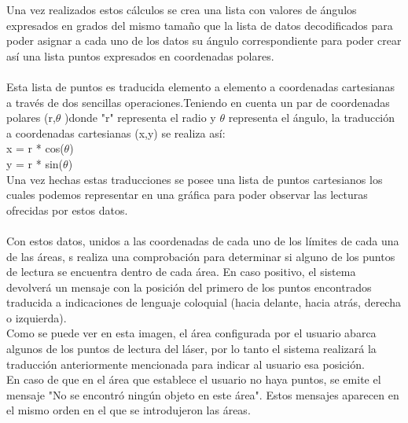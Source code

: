 Una vez realizados estos cálculos se crea una lista con valores de ángulos expresados en grados del mismo tamaño que la lista de datos decodificados para poder asignar a cada uno de los datos su ángulo correspondiente para poder crear así una lista puntos expresados en coordenadas polares.\\
\\
Esta lista de puntos es traducida elemento a elemento a coordenadas cartesianas a través de dos sencillas operaciones.Teniendo en cuenta un par de coordenadas polares (r,\(\theta\) )donde "r" representa el radio y \(\theta\)  representa el ángulo, la traducción a coordenadas cartesianas (x,y) se realiza así: \\
x = r * cos(\(\theta\))\\
y = r * sin(\(\theta\))\\
Una vez hechas estas traducciones se posee una lista de puntos cartesianos los cuales podemos representar en una gráfica para poder observar las lecturas ofrecidas por estos datos.\\
\\
Con estos datos, unidos a las coordenadas de cada uno de los límites de cada una de las áreas, s realiza una comprobación para determinar si alguno de los puntos de lectura se encuentra dentro de cada área. En caso positivo, el sistema devolverá un mensaje con la posición del primero de los puntos encontrados traducida a indicaciones de lenguaje coloquial (hacia delante, hacia atrás, derecha o izquierda).\\
Como se puede ver en esta imagen, el área configurada por el usuario abarca algunos de los puntos de lectura del láser, por lo tanto el sistema realizará la traducción anteriormente mencionada para indicar al usuario esa posición.\\
En caso de que en el área que establece el usuario no haya puntos, se emite el mensaje "No se encontró ningún objeto en este área". Estos mensajes aparecen en el mismo orden en el que se introdujeron las áreas.
